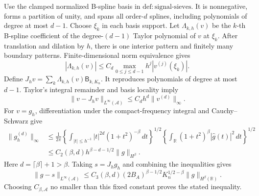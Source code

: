 Use the clamped normalized B-spline basis in \(\mathrm{def{:}signal\text{-}sieves}\). It is nonnegative, forms a partition of unity, and spans all order-\(d\) splines, including polynomials of degree at most \(d-1\). Choose \(\xi_k\) in each basis support. Let \(\Lambda_{k,h}(v)\) be the \(k\)-th B-spline coefficient of the degree-\((d-1)\) Taylor polynomial of \(v\) at \(\xi_k\). After translation and dilation by \(h\), there is one interior pattern and finitely many boundary patterns. Finite-dimensional norm equivalence gives
\[
 |\Lambda_{k,h}(v)|\le C_d\max_{0\le j\le d-1}h^j|v^{(j)}(\xi_k)|.
\]
Define \(J_hv=\sum_k\Lambda_{k,h}(v)\mathsf B_{k,K_n}\). It reproduces polynomials of degree at most \(d-1\). Taylor's integral remainder and basis locality imply
\[
 \|v-J_hv\|_{L^\infty(\mathcal A)}\le C_dh^d\|v^{(d)}\|_\infty.
\]
For \(v=g_h\), differentiation under the compact-frequency integral and Cauchy--Schwarz give
\[
 \begin{aligned}
 \|g_h^{(d)}\|_\infty
 &\le\frac1{2\pi}
 \left\{\int_{|t|\le h^{-1}}|t|^{2d}(1+t^2)^{-\beta}\,dt\right\}^{1/2}
 \left\{\int_{\mathbb R}(1+t^2)^\beta|\widehat g(t)|^2\,dt\right\}^{1/2}\\
 &\le C_2(\beta,d)h^{\beta-d-1/2}\|g\|_{H^\beta}.
 \end{aligned}
\]
Here \(d=\lceil\beta\rceil+1>\beta\). Taking \(s=J_hg_h\) and combining the inequalities gives
\[
 \|g-s\|_{L^\infty(\mathcal A)}
 \le C_3(\beta,d)(2B_A)^{\beta-1/2}K_n^{1/2-\beta}\|g\|_{H^\beta(\mathbb R)}.
\]
Choosing \(C_{\beta,\mathcal A}\) no smaller than this fixed constant proves the stated inequality.

